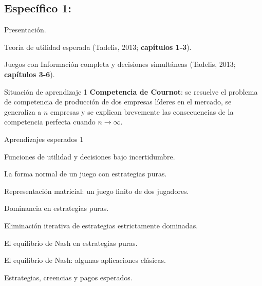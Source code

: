 \documentclass[11pt]{article}
\newenvironment{tight_enumerate}{
	\begin{enumerate}
		\setlength{\itemsep}{0pt}
		\setlength{\parskip}{0pt}
	}{\end{enumerate}}
\begin{document}
\begin{tcolorbox}[colback=bluerow!60]
	\subsection{Específico 1: }
		\begin{tight_enumerate}
			\item Presentación.
			\item Teoría de utilidad esperada (Tadelis, 2013;\textbf{ capítulos 1-3}).
			\item Juegos con Información completa y decisiones simultáneas (Tadelis, 2013;\textbf{ capítulos 3-6}).
		\end{tight_enumerate}
	\begin{mybox}[colback=redrow!80]{Situación de aprendizaje 1}
		 \textbf{Competencia de Cournot}: se resuelve el problema de competencia de producción de dos empresas líderes en el mercado, se generaliza a $n$ empresas y se explican brevemente las consecuencias de la competencia perfecta cuando $ n \rightarrow \infty $.
	\end{mybox}

	\begin{mybox}[colback=purplerow!80]{Aprendizajes esperados 1}
		\begin{tight_enumerate}
			\item Funciones de utilidad y decisiones bajo incertidumbre.
			\item La forma normal de un juego con estrategias puras. 
			\item Representación matricial: un juego finito de dos jugadores. 
			\item Dominancia en estrategias puras. 
			\item Eliminación iterativa de estrategias estrictamente dominadas. 
			\item El equilibrio de Nash en estrategias puras. 
			\item El equilibrio de Nash: algunas aplicaciones clásicas. 
			\item Estrategias, creencias y pagos esperados.
		\end{tight_enumerate}
	\end{mybox}
\end{tcolorbox}

\vspace*{1em}
\end{document}
